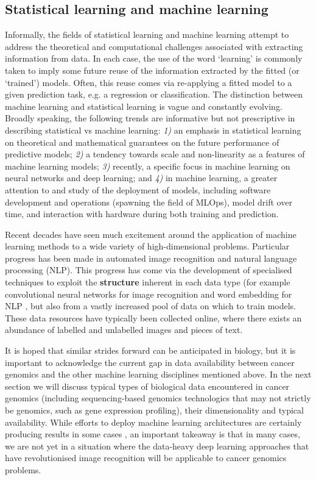 \documentclass[thesis.tex]{subfiles}
\begin{document}
\subsection{Statistical learning and machine learning} 
Informally, the fields of statistical learning and machine learning attempt to address the
theoretical and computational challenges associated with extracting information from data. In each case, the use of the word `learning' is commonly taken to imply some future reuse of the information extracted by the fitted (or `trained') models. Often, this reuse comes via re-applying a fitted model to a given prediction task, e.g. a regression or classification. The distinction between machine learning and statistical learning is vague and constantly evolving. Broadly speaking, the following trends are informative but not prescriptive in describing statistical vs machine learning: \emph{1)} an emphasis in statistical learning on theoretical and mathematical guarantees on the future performance of predictive models; \emph{2)} a tendency towards scale and non-linearity as a features of machine learning models; \emph{3)} recently, a specific focus in machine learning on neural networks and deep learning; and \emph{4)} in machine learning, a greater attention to and study of the deployment of models, including software development and operations (spawning the field of MLOps), model drift over time, and interaction with hardware during both training and prediction. 


 Recent decades have seen much excitement around the application of machine learning methods to a wide variety of high-dimensional problems. Particular progress has been made in automated image recognition and natural language processing (NLP). This progress has come via the development of specialised techniques to exploit the \textbf{structure} inherent in each data type (for example convolutional neural networks for image recognition \citep{liu_review_2017} and word embedding for NLP \citep{gutierrez_systematic_2019}, but also from a vastly increased pool of data on which to train models. These data resources have typically been collected online, where there exists an abundance of labelled and unlabelled images and pieces of text. 

It is hoped that similar strides forward can be anticipated in biology, but it is important to acknowledge the current gap in data availability between cancer genomics and the other machine learning disciplines mentioned above. In the next section we will discuss typical types of biological data encountered in cancer genomics (including sequencing-based genomics technologics that may not strictly be genomics, such as gene expression profiling), their dimensionality and typical availability. While efforts to deploy machine learning architectures are certainly producing results in some cases \citep{dubourg-felonneau_flatsomatic_2019, dubourg-felonneau_learning_2019}, an important takeaway is that in many cases, we are not yet in a situation where the data-heavy deep learning approaches that have revolutionised image recognition will be applicable to cancer genomics problems. 
\end{document}
